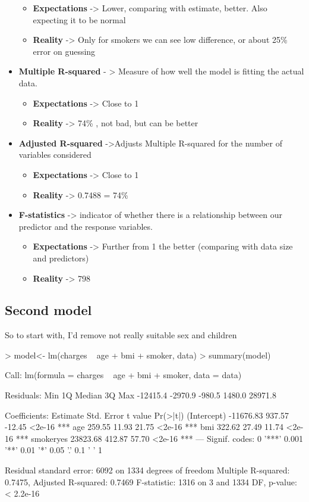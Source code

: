 \documentclass{article}
\begin{document}
\begin{itemize}
\begin{itemize}
    \item \textbf{Expectations} -> Lower, comparing with estimate, better.
    Also expecting it to be normal
    \item \textbf{Reality} -> Only for smokers we can see low difference, or about 25\% error on guessing
  \end{itemize}
    \item \textbf{Multiple R-squared} - > Measure of how well the model is fitting the actual data.
  \begin{itemize}
    \item \textbf{Expectations} -> Close to 1
    \item \textbf{Reality} -> 74\% , not bad, but can be better
  \end{itemize}
    \item \textbf{Adjusted R-squared} ->Adjusts Multiple R-squared for the number of variables considered
  \begin{itemize}
    \item \textbf{Expectations} -> Close to 1
    \item \textbf{Reality} -> 0.7488 = 74\%
  \end{itemize}
  \item \textbf{F-statistics} -> indicator of whether there is a relationship between our predictor and the response variables. 
  \begin{itemize}
    \item \textbf{Expectations} -> Further from 1 the better (comparing with data size and predictors)
    \item \textbf{Reality} -> 798
  \end{itemize}
\end{itemize}

\subsection{Second model}
So to start with, I'd remove not really suitable sex and children

\begin{Schunk}
\begin{Sinput}
> model<- lm(charges ~ age + bmi + smoker, data)
> summary(model)
\end{Sinput}
\begin{Soutput}
Call:
lm(formula = charges ~ age + bmi + smoker, data = data)

Residuals:
     Min       1Q   Median       3Q      Max 
-12415.4  -2970.9   -980.5   1480.0  28971.8 

Coefficients:
             Estimate Std. Error t value Pr(>|t|)    
(Intercept) -11676.83     937.57  -12.45   <2e-16 ***
age            259.55      11.93   21.75   <2e-16 ***
bmi            322.62      27.49   11.74   <2e-16 ***
smokeryes    23823.68     412.87   57.70   <2e-16 ***
---
Signif. codes:  0 '***' 0.001 '**' 0.01 '*' 0.05 '.' 0.1 ' ' 1

Residual standard error: 6092 on 1334 degrees of freedom
Multiple R-squared:  0.7475,	Adjusted R-squared:  0.7469 
F-statistic:  1316 on 3 and 1334 DF,  p-value: < 2.2e-16
\end{Soutput}
\end{Schunk}
\end{document}
